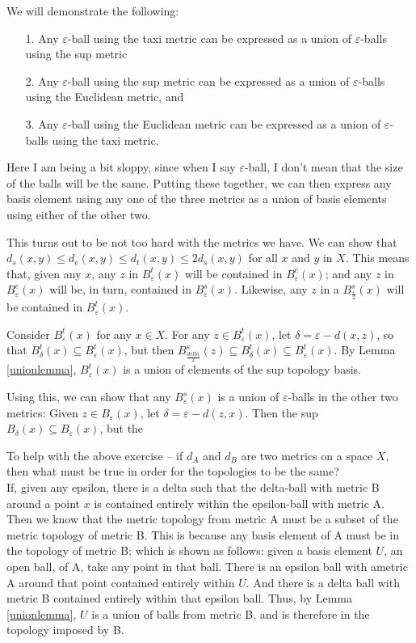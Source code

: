 \documentclass[12pt]{report}
\newcommand{\exercise}{ \noindent{\sc Exercise }\hspace{5pt} }
\newcommand{\eball}{B_\varepsilon}
\newcommand{\dball}{B_\delta}
\newcommand{\ball}[1]{B_{#1}}
\begin{document}
We will demonstrate the following:
\begin{itemize}
\item[1.] Any $\varepsilon$-ball using the taxi metric can be
expressed as a union of $\varepsilon$-balls using the sup metric
\item[2.] Any $\varepsilon$-ball using the sup metric can be expressed as a 
union of $\varepsilon$-balls using the Euclidean metric, and 
\item[3.] Any $\varepsilon$-ball using the Euclidean metric can be expressed
as a union of $\varepsilon$-balls using the taxi metric.
\end{itemize}
Here I am being a bit sloppy, since when I say $\varepsilon$-ball, I don't
mean that the size of the balls will be the same. Putting these together, we
can then express any basis element using any one of the three metrics as a
union of basis elements using either of the other two.

This turns out to be not too hard with the metrics we have. We can show that
$d_s(x,y) \leq d_e(x,y) \leq d_t(x,y) \leq 2d_s(x,y)$ for all $x$ and $y$
in $X$.  This means that, given any $x$,
any $z$ in $\eball^t(x)$ will be contained in $\eball^e(x)$;
and any $z$ in $\eball^e(x)$ will be, in turn, contained in 
$\eball^s(x)$.  Likewise, any $z$ in a $\ball{\frac{\varepsilon}{2}}^s(x)$ 
will be contained in $\eball^t(x)$.  

Consider $\eball^t(x)$ for any $x \in X$. For any $z \in \eball^t(x)$, let
$\delta = \varepsilon - d(x,z)$, so that $\dball^t(x) \subseteq \eball^t(x)$,
but then $\ball{\frac{delta}{2}}^s(z) \subseteq \dball^t(x) \subseteq
\eball^t(x)$. By Lemma \ref{unionlemma}, $\eball^t(x)$ is a union of
elements of the sup topology basis.



Using this, we can show that any $\eball^s(x)$  is a union of
$\varepsilon$-balls in the other two metrics: Given $z \in \eball(x)$, let
$\delta = \varepsilon - d(z,x)$. Then the sup $\dball(x) \subseteq \eball(x)$,
but the 

\exercise To help with the above exercise -- if $d_A$ and $d_B$ are 
two metrics on a space $X$, then what must be true in order for the topologies
to be the same?\\

If, given any epsilon, there is a delta such that the delta-ball with metric B
around a point $x$ is contained entirely within the epsilon-ball with metric
A. Then we know that the metric topology from metric A must be a subset of the
metric topology of metric B. This is because any basis element of A must be in
the topology of metric B; which is shown as follows: given a basis element $U$, an open ball, of A, take any point in that ball. There is an epsilon ball with
ametric A around that point contained entirely within $U$. And there is a
delta ball with metric B contained entirely within that epsilon ball. Thus, by
Lemma \ref{unionlemma}, $U$ is a union of balls from metric B, and is
therefore in the topology imposed by B. 
\end{document}
